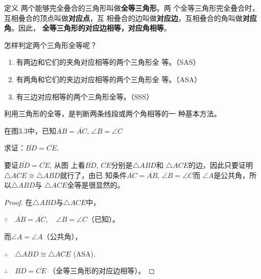 \begin{figure}[htp]
    \centering
{}
    \caption{}
\end{figure}

\begin{blk}{定义}
两个能够完全叠合的三角形叫做\textbf{全等三角形}。两
个全等三角形完全叠合时，互相叠合的顶点叫做\textbf{对应点}，互
相叠合的边叫做\textbf{对应边}，互相叠合的角叫做\textbf{对应角}。因此，
\textbf{全等三角形的对应边相等，对应角相等}。
\end{blk}
 
怎样判定两个三角形全等呢？
\begin{enumerate}
\item 有两边和它们的夹角对应相等的两个三角形全
等。（SAS）
\item 有两角和它们的夹边对应相等的两个三角形全
等。（ASA）
\item 有三边对应相等的两个三角形全等。（SSS）
\end{enumerate}

利用三角形的全等，是判断两条线段或两个角相等的一
种基本方法。

\begin{example}
    在图3.3中，已知$\overline{AB}=\overline{AC}$, $\angle B=\angle C$
    
    求证：$\overline{BD}=\overline{CE}$.
\end{example}



\begin{analyze}
    要证$\overline{BD}=\overline{CE}$, 从图
上看$\overline{BD}$, $\overline{CE}$分别是$\triangle ABD$和
$\triangle ACE$的边，因此只要证明
$\triangle ACE \cong \triangle ABD$就行了，由已
知条件$\overline{AC}=\overline{AB}$, $\angle B=\angle C$而
$\angle A$是公共角，所以$\triangle ABD$与
$\triangle ACE$全等是很显然的。
\end{analyze}

\begin{proof}
在$\triangle ABD$与$\triangle ACE$中，

$\because\quad \overline{AB}=\overline{AC},\quad \angle B=\angle C$（已知）。

而$\angle A=\angle A$（公共角），

$\therefore\quad \triangle ABD\cong \triangle ACE$ (ASA).

$\therefore\quad \overline{BD}=\overline{CE}$ （全等三角形的对应边相等）。
\end{proof}    


